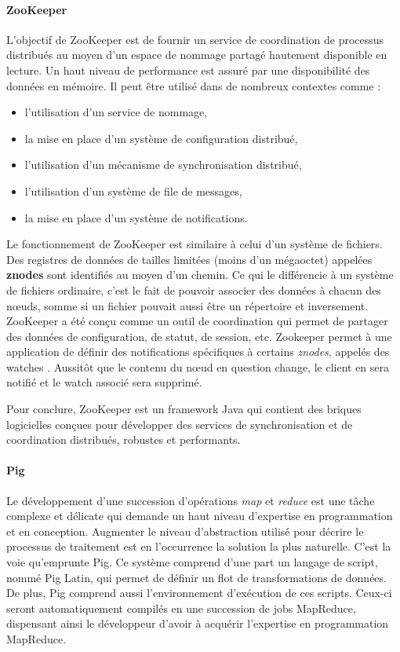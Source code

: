 \documentclass[12pt]{article}
\begin{document}
\paragraph{ZooKeeper}
L'objectif de ZooKeeper est de fournir un service de coordination de processus distribués au moyen d'un espace de nommage partagé hautement disponible en lecture. Un haut niveau de performance est assuré par une disponibilité des données en mémoire. Il peut être utilisé dans de nombreux contextes comme :
\begin{itemize}
\item l'utilisation d'un service de nommage,
\item la mise en place d'un système de configuration distribué,
\item l'utilisation d'un mécanisme de synchronisation distribué,
\item l'utilisation d'un système de file de messages,
\item la mise en place d'un système de notifications.
\end{itemize}
Le fonctionnement de ZooKeeper est similaire à celui d'un système de fichiers. Des registres de données de tailles limitées (moins d'un mégaoctet) appelées \textbf{znodes} sont identifiés au moyen d'un chemin. Ce qui le différencie à un système de fichiers ordinaire, c'est le fait de pouvoir associer des données à chacun des nœuds, somme si un fichier pouvait aussi être un répertoire et inversement. ZooKeeper a été conçu comme un outil de coordination qui permet de partager des données de configuration, de statut, de session, etc.
Zookeeper permet à une application de définir des notifications spécifiques à certains \textit{znodes}, appelés des \og watches \fg. Aussitôt que le contenu du nœud en question change, le client en sera notifié et le watch associé sera supprimé.
\par
Pour conclure, ZooKeeper est un framework Java qui contient des briques logicielles conçues pour développer des services de synchronisation et de coordination distribués, robustes et performants.
\paragraph{Pig}
Le développement d'une succession d'opérations \textit{map} et \textit{reduce} est une tâche complexe et délicate qui demande un haut niveau d'expertise en programmation et en conception. Augmenter le niveau d'abstraction utilisé pour décrire le processus de traitement est en l'occurrence la solution la plus naturelle. C'est la voie qu'emprunte Pig. Ce système comprend d'une part un langage de script, nommé Pig Latin, qui permet de définir un flot de transformations de données. De plus, Pig comprend aussi l'environnement d'exécution de ces scripts. Ceux-ci seront automatiquement compilés en une succession de jobs MapReduce, dispensant ainsi le développeur d'avoir à acquérir l'expertise en programmation MapReduce.
\end{document}
